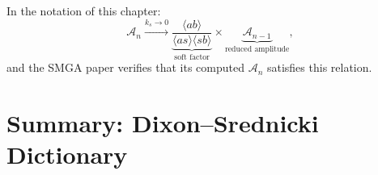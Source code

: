In the notation of this chapter:
\begin{equation}
  \mathcal{A}_n \xrightarrow{k_s\to 0}
  \underbrace{\frac{\langle ab\rangle}{\langle as\rangle\langle sb\rangle}}_{\text{soft factor}}\times
  \underbrace{\mathcal{A}_{n-1}}_{\text{reduced amplitude}},
\end{equation}
and the SMGA paper verifies that its computed $\mathcal{A}_n$ satisfies this relation.


\section{Summary: Dixon--Srednicki Dictionary}
\label{sec:dictionary}

